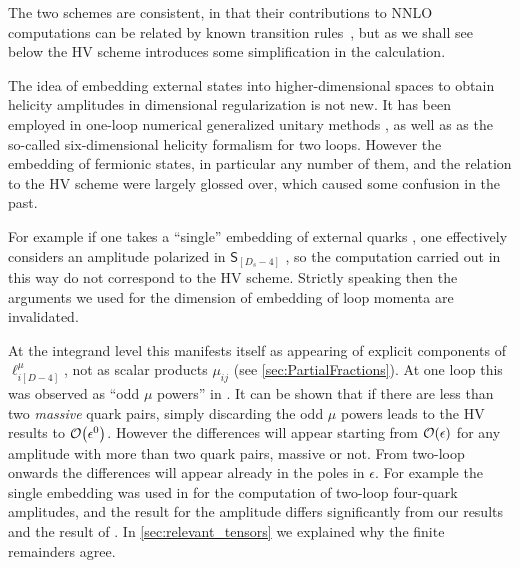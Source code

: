 
The two schemes are consistent,
in that their contributions to NNLO computations can be related by known
transition rules~\cite{Broggio:2015dga}, but as we
shall see below the HV scheme introduces some simplification in
the calculation.

The idea of embedding external states into higher-dimensional spaces to obtain
helicity amplitudes in dimensional regularization is not new. 
It has been employed in one-loop numerical generalized
unitary methods \cite{Ellis:2007br,Giele:2008ve}, as well as as 
the so-called six-dimensional helicity formalism \cite{Bern2011,Cheung:2009dc,Badger:2013gxa,Badger:2017jhb} for two loops.
However the embedding of fermionic states, in particular any number of them,
and the relation to the HV scheme were largely glossed over,
which caused some confusion in the past.

For example if one takes a ``single'' embedding of external quarks  ,
one effectively considers an amplitude polarized in $\mathsf{S}_{[D_s-4]}$ ,
so the computation carried out in this way do not correspond to the HV scheme.
Strictly speaking then the arguments we used for the dimension of embedding of loop momenta are invalidated.

At the integrand level this manifests itself as appearing of explicit components of $\ell^\mu_{i[D-4]}$, not as scalar products $\mu_{ij}$ (see \cref{sec:PartialFractions}).
At one loop this was observed as ``odd $\mu$ powers'' in \cite{Fazio:2014xea,Badger:2017gta}.
It can be shown that if there are less than two \emph{massive} quark pairs, simply discarding 
the odd $\mu$ powers leads to the HV results to $\order{\eps^0}$.
However the differences will appear starting from $\order{\epsilon}$ for any amplitude
with more than two quark pairs, massive or not.
From two-loop onwards the differences will appear already in the poles in $\epsilon$. 
For example the single embedding was used in \cite{DeFreitas:2004kmi} for the computation of two-loop four-quark amplitudes,
and the result for the amplitude differs significantly from our results and the result of \cite{Glover:2004si}.
In \cref{sec:relevant_tensors} we explained why the finite remainders agree.



